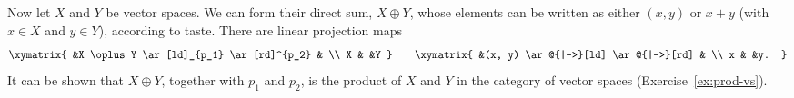 \begin{example}
\label{eg:prod-vs}
Now let $X$ and $Y$ be vector spaces.  We can form their direct sum,%
%
%
%
$X \oplus Y$,%
%
%
whose elements can be written as either $(x, y)$ or $x + y$ (with $x \in
X$ and $y \in Y$), according to taste.  There are linear projection maps
\[
\xymatrix{
        &X \oplus Y \ar[ld]_{p_1} \ar[rd]^{p_2}     &       \\
X       &                                               &Y
}
% 
\qquad
% 
\xymatrix{
        &(x, y) \ar@{|->}[ld] \ar@{|->}[rd]     &       \\
x       &                                       &y.
}
\]
It can be shown that $X \oplus Y$, together with $p_1$ and $p_2$, is the
product of $X$ and $Y$ in the category of vector spaces
(Exercise~\ref{ex:prod-vs}).
\end{example}

